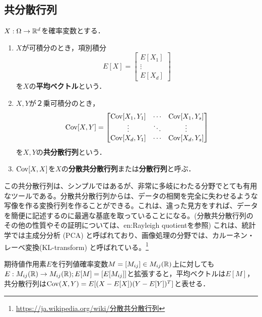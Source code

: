 \documentclass[uplatex,dvipdfmx]{jsreport}
\begin{document}
\subsection{共分散行列}

\begin{definition}
    $X:\Omega\to\mathbb{R}^d$を確率変数とする．
    \begin{enumerate}
        \item $X$が可積分のとき，項別積分
        \[E[X]=\begin{bmatrix}
            E[X_1]\\\vdots\\E[X_d]
        \end{bmatrix}\]
        を$X$の\textbf{平均ベクトル}という．
        \item $X,Y$が２乗可積分のとき，
        \[\mathrm{Cov}[X,Y]=\begin{bmatrix}
            \mathrm{Cov}[X_1,Y_1]&\cdots&\mathrm{Cov}[X_1,Y_s]\\
            \vdots&\ddots&\vdots\\
            \mathrm{Cov}[X_d,Y_1]&\cdots&\mathrm{Cov}[X_d,Y_s]
        \end{bmatrix}\]
        を$X,Y$の\textbf{共分散行列}という．
        \item $\mathrm{Cov}[X,X]$を$X$の\textbf{分散共分散行列}または\textbf{分散行列}と呼ぶ．
    \end{enumerate}
\end{definition}
\begin{remark}
    この共分散行列は、シンプルではあるが、非常に多岐にわたる分野でとても有用なツールである。分散共分散行列からは、データの相関を完全に失わせるような写像を作る変換行列を作ることができる。これは、違った見方をすれば、データを簡便に記述するのに最適な基底を取っていることになる。(分散共分散行列のその他の性質やその証明については、en:Rayleigh quotientを参照) これは、統計学では主成分分析 (PCA) と呼ばれており、画像処理の分野では、カルーネン・レーベ変換(KL-transform) と呼ばれている。\footnote{\url{https://ja.wikipedia.org/wiki/分散共分散行列}}
\end{remark}

\begin{notation}[期待値作用素の拡張]
    期待値作用素$E$を行列値確率変数$M=[M_{ij}]\in M_{ij}(\mathbb{R})$上に対しても$E:M_{ij}(\mathbb{R})\to M_{ij}(\mathbb{R});E[M]=[E[M_{ij}]]$と拡張すると，平均ベクトルは$E[M]$，共分散行列は$\mathrm{Cov}(X,Y)=E[(X-E[X])(Y-E[Y])^T]$と表せる．
\end{notation}
\end{document}

